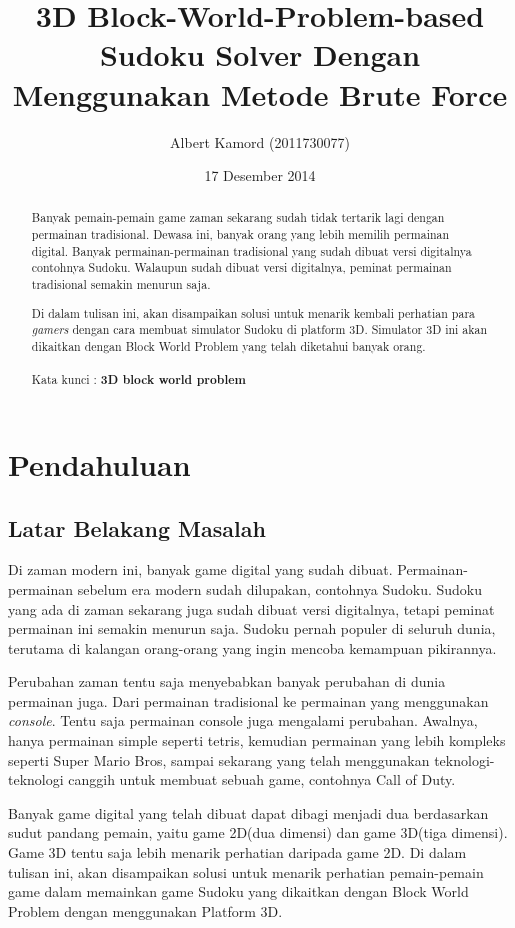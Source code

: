 \documentclass[11pt,a4paper]{report}
\author{Albert Kamord (2011730077)}
\title{3D Block-World-Problem-based Sudoku Solver Dengan Menggunakan Metode Brute Force}
\date{17 Desember 2014}
\begin{document}
\maketitle
\begin{abstract}

\indent Banyak pemain-pemain game zaman sekarang sudah tidak tertarik lagi dengan permainan tradisional. Dewasa ini, banyak orang yang lebih memilih permainan digital. Banyak permainan-permainan tradisional yang sudah dibuat versi digitalnya contohnya Sudoku. Walaupun sudah dibuat versi digitalnya, peminat permainan tradisional semakin menurun saja.

\indent Di dalam tulisan ini, akan disampaikan solusi untuk menarik kembali perhatian para \textit{gamers} dengan cara membuat simulator Sudoku di platform 3D. Simulator 3D ini akan dikaitkan dengan Block World Problem yang telah diketahui banyak orang. \\
\\
Kata kunci : \textbf{3D block world problem}
\end{abstract}

\tableofcontents \newpage 	%
\listoffigures \newpage 	%


\chapter{Pendahuluan} %
\section{Latar Belakang Masalah}
\indent Di zaman modern ini, banyak game digital yang sudah dibuat. Permainan-permainan sebelum era modern sudah dilupakan, contohnya Sudoku. Sudoku yang ada di zaman sekarang juga sudah dibuat versi digitalnya, tetapi peminat permainan ini semakin menurun saja. Sudoku pernah populer di seluruh dunia, terutama di kalangan orang-orang yang ingin mencoba kemampuan pikirannya.

\indent Perubahan zaman tentu saja menyebabkan banyak perubahan di dunia permainan juga. Dari permainan tradisional ke permainan yang menggunakan \textit{console}. Tentu saja permainan console juga mengalami perubahan. Awalnya, hanya permainan simple seperti tetris, kemudian permainan yang lebih kompleks seperti Super Mario Bros, sampai sekarang yang telah menggunakan teknologi-teknologi canggih untuk membuat sebuah game, contohnya Call of Duty.

\indent Banyak game digital yang telah dibuat dapat dibagi menjadi dua berdasarkan sudut pandang pemain, yaitu game 2D(dua dimensi) dan game 3D(tiga dimensi). Game 3D tentu saja lebih menarik perhatian daripada game 2D. Di dalam tulisan ini, akan disampaikan solusi untuk menarik perhatian pemain-pemain game dalam memainkan game Sudoku yang dikaitkan dengan Block World Problem dengan menggunakan Platform 3D.
\end{document}
